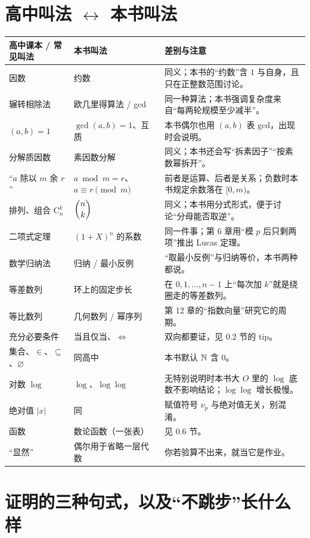 \section{高中叫法 $\leftrightarrow$ 本书叫法}
\begin{longtable}{>{\raggedright\arraybackslash}p{}>{\raggedright\arraybackslash}p{}>{\raggedright\arraybackslash}p{}}
\toprule
高中课本 / 常见叫法 & 本书叫法 & 差别与注意\\\midrule
因数 & 约数 & 同义；本书的“约数”含 $1$ 与自身，且只在正整数范围讨论。\\
辗转相除法 & 欧几里得算法 / gcd & 同一种算法；本书强调复杂度来自“每两轮规模至少减半”。\\
$(a,b)=1$ & $\gcd(a,b)=1$、互质 & 本书偶尔也用 $(a,b)$ 表 gcd，出现时会说明。\\
分解质因数 & 素因数分解 & 同义；本书还会写“拆素因子”“按素数幂拆开”。\\
“$a$ 除以 $m$ 余 $r$” & $a\bmod m=r$、$a\equiv r\pmod m$ & 前者是运算、后者是关系；负数时本书规定余数落在 $[0,m)$。\\
排列、组合 $\mathrm{C}_n^k$ & $\dbinom{n}{k}$ & 同义；本书用分式形式，便于讨论“分母能否取逆”。\\
二项式定理 & $(1+X)^n$ 的系数 & 同一件事；第 6 章用“模 $p$ 后只剩两项”推出 Lucas 定理。\\
数学归纳法 & 归纳 / 最小反例 & “取最小反例”与归纳等价，本书两种都说。\\
等差数列 & 环上的固定步长 & 在 $0,1,\ldots,n-1$ 上“每次加 $k$”就是绕圈走的等差数列。\\
等比数列 & 几何数列 / 幂序列 & 第 12 章的“指数向量”研究它的周期。\\
充分必要条件 & 当且仅当、$\iff$ & 双向都要证，见 0.2 节的 tip。\\
集合、$\in$、$\subseteq$、$\varnothing$ & 同高中 & 本书默认 $\mathbb N$ 含 $0$。\\
对数 $\log$ & $\log$、$\log\log$ & 无特别说明时本书大 $O$ 里的 $\log$ 底数不影响结论；$\log\log$ 增长极慢。\\
绝对值 $|x|$ & 同 & 赋值符号 $\nu_p$ 与绝对值无关，别混淆。\\
函数 & 数论函数（一张表） & 见 0.6 节。\\
“显然” & 偶尔用于省略一层代数 & 你若验算不出来，就当它是作业。\\
\bottomrule
\end{longtable}

\section{证明的三种句式，以及“不跳步”长什么样}
